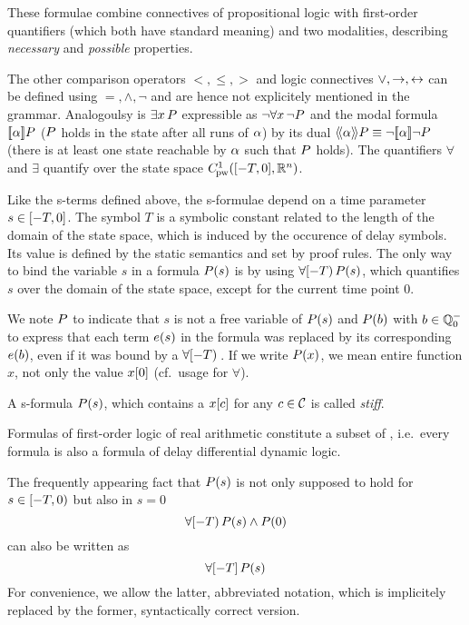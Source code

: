    These formulae combine connectives of propositional logic with first-order quantifiers (which both have standard meaning) and two modalities, describing \emph{necessary} and \emph{possible} properties.

    The other comparison operators $<,\leq,>$ and logic connectives $\lor,\rightarrow,\leftrightarrow$ can be defined using $=,\land,\lnot$ and are hence not explicitely mentioned in the grammar.
    Analogoulsy is $\exists x{\,} P$ expressible as $\lnot\forall x{\,} \lnot P$ and the modal formula $\dbox{\asprg}{\asfml}$ ($P$ holds in the state after all runs of $\alpha$) by its dual $\ddiamond{\asprg}{\asfml}\equiv\lnot\dbox{\asprg}{\lnot\asfml}$ (there is at least one state reachable by $\alpha$ such that $P$ holds).
    The quantifiers $\forall$ and $\exists$ quantify over the state space $\statespace$.

    Like the s-terms defined above, the s-formulae depend on a time parameter $s\in[-T,0]$. The symbol $T$ is a symbolic constant related to the length of the domain of the state space, which is induced by the occurence of delay symbols. Its value is defined by the static semantics and set by proof rules.
    The only way to bind the variable $s$ in a formula $P(s)$ is by using $\forall [-T){\,} P(s)$, which quantifies $s$ over the domain of the state space, except for the current time point $0$.

    We note $P$ to indicate that $s$ is not a free variable of $P(s)$ and $P(b)$ with $b\in\mathbb{Q}^-_0$ to express that each term $e(s)$ in the formula was replaced by its corresponding $e(b)$, even if it was bound by a $\forall [-T){\,}$.
    If we write $P(x)$, we mean entire function $x$, not only the value $x[0]$ (cf.\ usage for $\forall$).

    A s-formula $P(s)$, which contains a $x[c]$ for any $c\in\mathcal{C}_{}$ is called \emph{stiff}.
    
    Formulas of first-order logic of real arithmetic constitute a subset of \ddL, i.e.\ every \FOLR formula is also a formula of delay differential dynamic logic.

    \begin{convention}
        The frequently appearing fact that $P(s)$ is not only supposed to hold for $s\in[-T,0)$ but also in $s=0$
        \begin{equation*}
            \forall [-T){\,} P(s)\land P(0)
        \end{equation*}
        can also be written as
        \begin{equation*}
            \forall [-T]{\,} P(s)
        \end{equation*}
        For convenience, we allow the latter, abbreviated notation, which is implicitely replaced by the former, syntactically correct version.
    \end{convention}


